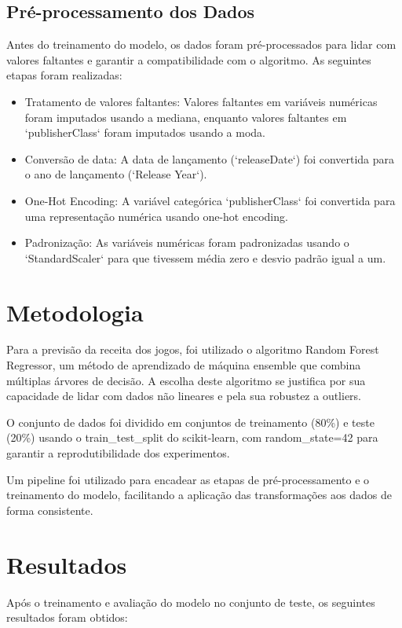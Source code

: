 \documentclass[12pt]{article}
\begin{document}
\subsection{Pré-processamento dos Dados}

Antes do treinamento do modelo, os dados foram pré-processados para lidar com valores faltantes e garantir a compatibilidade com o algoritmo.  As seguintes etapas foram realizadas:

\begin{itemize}
\item Tratamento de valores faltantes:  Valores faltantes em variáveis numéricas foram imputados usando a mediana, enquanto valores faltantes em `publisherClass` foram imputados usando a moda.
\item Conversão de data: A data de lançamento (`releaseDate`) foi convertida para o ano de lançamento (`Release Year`).
\item One-Hot Encoding: A variável categórica `publisherClass` foi convertida para uma representação numérica usando one-hot encoding.
\item Padronização: As variáveis numéricas foram padronizadas usando o `StandardScaler` para que tivessem média zero e desvio padrão igual a um.
\end{itemize}

\section{Metodologia}

Para a previsão da receita dos jogos, foi utilizado o algoritmo Random Forest Regressor, um método de aprendizado de máquina ensemble que combina múltiplas árvores de decisão.  A escolha deste algoritmo se justifica por sua capacidade de lidar com dados não lineares e pela sua robustez a outliers.

O conjunto de dados foi dividido em conjuntos de treinamento (80\%) e teste (20\%) usando o train\_test\_split do scikit-learn, com random\_state=42 para garantir a reprodutibilidade dos experimentos.

Um pipeline foi utilizado para encadear as etapas de pré-processamento e o treinamento do modelo, facilitando a aplicação das transformações aos dados de forma consistente.

\section{Resultados}
Após o treinamento e avaliação do modelo no conjunto de teste, os seguintes resultados foram obtidos:
\end{document}
